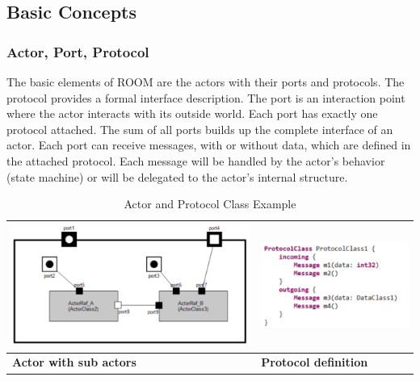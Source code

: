 \subsection{Basic Concepts}
\label{sec:basic_concepts}

\subsubsection{Actor, Port, Protocol}

The basic elements of ROOM are the actors with their ports and protocols.
The protocol provides a formal interface description. The port is an interaction
point where the actor interacts with its outside world. Each port has exactly one protocol
attached. The sum of all ports builds up the complete interface of an actor.
Each port can receive messages, with or without data, which are defined in the attached protocol.
Each message will be handled by the actor's behavior (state machine) or will be delegated to the actor's internal structure.

\begin{table}
\caption{Actor and Protocol Class Example}
\begin{tabular}{|l|l|}
\hline
\includegraphics[scale=0.85]{images/040-ActorClass.png} & \includegraphics[scale=0.85]{images/040-ProtocolClassTextualNotation.png} \\ \hline
\textbf{Actor with sub actors} & \textbf{Protocol definition} \\ \hline
\end{tabular}
\end{table}

